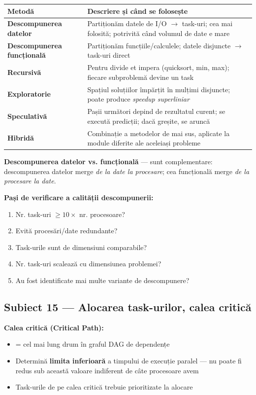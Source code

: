 \documentclass[a4paper,11pt]{article}
\newcommand{\thead}[1]{\cellcolor{tblh}\color{white}\textbf{#1}}
\newcommand{\subiect}[2]{\subsection{Subiect \textcolor{numcol}{#1} — #2}}
\begin{document}
\begin{center}
\begin{tabularx}{\textwidth}{lX}
\toprule
\thead{Metodă} & \thead{Descriere și când se folosește} \\
\midrule
\textbf{Descompunerea datelor} & Partiționăm datele de I/O $\to$ task-uri; cea mai folosită; potrivită când volumul de date e mare \\
\textbf{Descompunerea funcțională} & Partiționăm funcțiile/calculele; datele disjuncte $\to$ task-uri direct \\
\textbf{Recursivă} & Pentru divide et impera (quicksort, min, max); fiecare subproblemă devine un task \\
\textbf{Exploratorie} & Spațiul soluțiilor împărțit în mulțimi disjuncte; poate produce \emph{speedup superliniar} \\
\textbf{Speculativă} & Pașii următori depind de rezultatul curent; se execută predicții; dacă greșite, se aruncă \\
\textbf{Hibridă} & Combinație a metodelor de mai sus, aplicate la module diferite ale aceleiași probleme \\
\bottomrule
\end{tabularx}
\end{center}

\begin{notebox}
\textbf{Descompunerea datelor vs. funcțională} — sunt complementare: descompunerea datelor merge \emph{de la date la procesare}; cea funcțională merge \emph{de la procesare la date}.
\end{notebox}

\textbf{Pași de verificare a calității descompunerii:}
\begin{enumerate}[noitemsep]
  \item Nr. task-uri $\geq 10 \times$ nr. procesoare?
  \item Evită procesări/date redundante?
  \item Task-urile sunt de dimensiuni comparabile?
  \item Nr. task-uri scalează cu dimensiunea problemei?
  \item Au fost identificate mai multe variante de descompunere?
\end{enumerate}

\subiect{15}{Alocarea task-urilor, calea critică}

\textbf{Calea critică (Critical Path):}
\begin{itemize}[noitemsep]
  \item = cel mai lung drum în graful DAG de dependențe
  \item Determină \textbf{limita inferioară} a timpului de execuție paralel — nu poate fi redus sub această valoare indiferent de câte procesoare avem
  \item Task-urile de pe calea critică trebuie prioritizate la alocare
\end{itemize}
\end{document}
